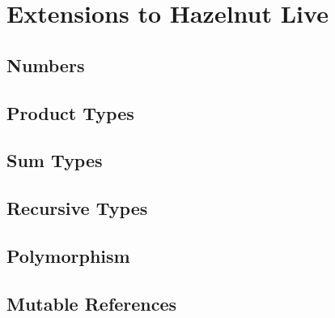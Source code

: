 \newcommand{\extensionsSec}{Extensions to Hazelnut Live}
\section{\protect\extensionsSec} %
\label{sec:extensions}

\subsection{Numbers}

\subsection{Product Types}


\subsection{Sum Types}


\subsection{Recursive Types}

\subsection{Polymorphism}

\subsection{Mutable References}

